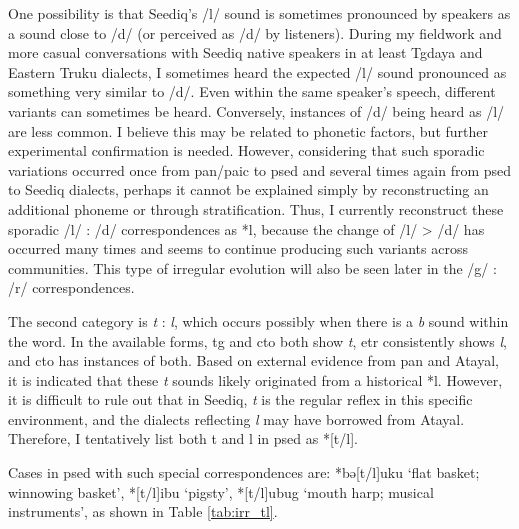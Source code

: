 One possibility is that Seediq's /l/ sound is sometimes pronounced by speakers as a sound close to /d/ (or perceived as /d/ by listeners). During my fieldwork and more casual conversations with Seediq native speakers in at least Tgdaya and Eastern Truku dialects, I sometimes heard the expected /l/ sound pronounced as something very similar to /d/. Even within the same speaker's speech, different variants can sometimes be heard. Conversely, instances of /d/ being heard as /l/ are less common. I believe this may be related to phonetic factors, but further experimental confirmation is needed. However, considering that such sporadic variations occurred once from \acl{pan}/\acl{paic} to \acl{psed} and several times again from \acl{psed} to Seediq dialects, perhaps it cannot be explained simply by reconstructing an additional phoneme or through stratification. Thus, I currently reconstruct these sporadic /l/ : /d/ correspondences as *l, because the change of /l/ > /d/ has occurred many times and seems to continue producing such variants across communities. This type of irregular evolution will also be seen later in the /g/ : /r/ correspondences.

The second category is \textit{t} : \textit{l}, which occurs possibly when there is a \textit{b} sound within the word. In the available forms, \acl{tg} and \acl{cto} both show \textit{t}, \acl{etr} consistently shows \textit{l}, and \acl{cto} has instances of both. Based on external evidence from \acl{pan} and Atayal, it is indicated that these \textit{t} sounds likely originated from a historical *l. However, it is difficult to rule out that in Seediq, \textit{t} is the regular reflex in this specific environment, and the dialects reflecting \textit{l} may have borrowed from Atayal. Therefore, I tentatively list both t and l in \acl{psed} as *[t/l].

Cases in \acl{psed} with such special correspondences are: *bə[t/l]uku `flat basket; winnowing basket', *[t/l]ibu `pigsty', *[t/l]ubug `mouth harp; musical instruments', as shown in Table \ref{tab:irr_tl}.

